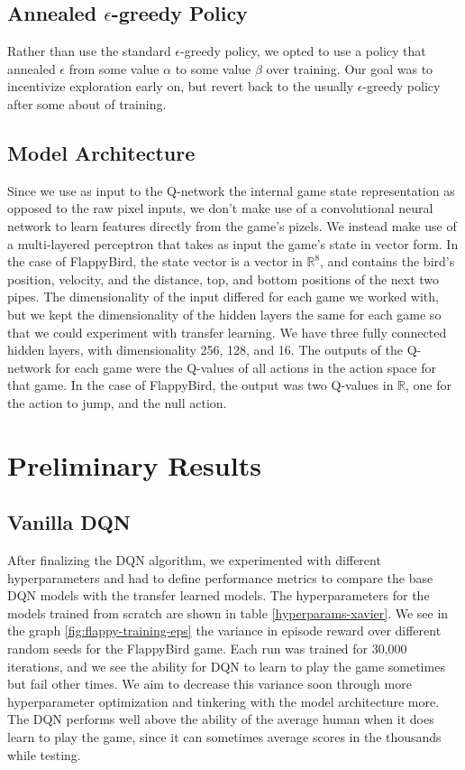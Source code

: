 \documentclass{article}
\begin{document}
\subsection{Annealed $\epsilon$-greedy Policy}
Rather than use the standard $\epsilon$-greedy policy, we opted to use a policy that annealed $\epsilon$ from some value $\alpha$ to some value $\beta$ over training.
Our goal was to incentivize exploration early on, but revert back to the usually $\epsilon$-greedy policy after some about of training.


\subsection{Model Architecture}
Since we use as input to the Q-network the internal game state representation as opposed to the raw pixel inputs, we don't make use of a convolutional neural network to learn features directly from the game's pizels.
We instead make use of a multi-layered perceptron that takes as input the game's state in vector form.
In the case of FlappyBird, the state vector is a vector in $\mathbb{R}^8$, and contains the bird's position, velocity, and the distance, top, and bottom positions of the next two pipes.
The dimensionality of the input differed for each game we worked with, but we kept the dimensionality of the hidden layers the same for each game so that we could experiment with transfer learning.
We have three fully connected hidden layers, with dimensionality 256, 128, and 16.
The outputs of the Q-network for each game were the Q-values of all actions in the action space for that game.
In the case of FlappyBird, the output was two Q-values in $\mathbb{R}$, one for the action to jump, and the null action.

\section{Preliminary Results}

\subsection{Vanilla DQN}
After finalizing the DQN algorithm, we experimented with different hyperparameters and had to define performance metrics to compare the base DQN models with the transfer learned models. 
The hyperparameters for the models trained from scratch are shown in table \ref{hyperparams-xavier}.
We see in the graph \ref{fig:flappy-training-eps} the variance in episode reward over different random seeds for the FlappyBird game.
Each run was trained for 30,000 iterations, and we see the ability for DQN to learn to play the game sometimes but fail other times.
We aim to decrease this variance soon through more hyperparameter optimization and tinkering with the model architecture more.
The DQN performs well above the ability of the average human when it does learn to play the game, since it can sometimes average scores in the thousands while testing.
\end{document}
